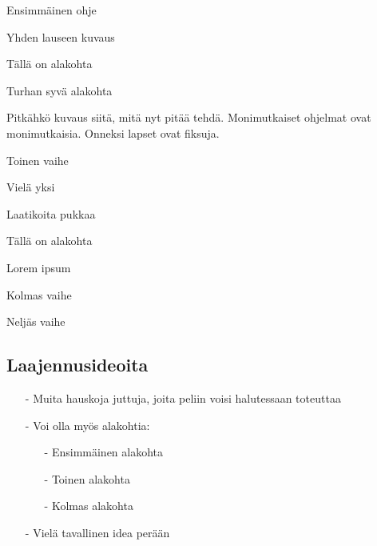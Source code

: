 \documentclass[12pt,twoside]{article}
\newenvironment{vaihetaso1}{%
    \LARGE
    \itemize
}{%
    \enditemize
}
\newenvironment{vaihetaso2}{%
    \Large
    \itemize
}{%
    \enditemize
}
\newenvironment{vaihetaso3}{%
    \large
    \itemize
}{%
    \enditemize
}
\begin{document}
\begin{vaihetaso1}
	\item Ensimmäinen ohje
	\begin{vaihetaso2}
		\item Yhden lauseen kuvaus
		\item Tällä on alakohta
		\begin{vaihetaso3}
			\item Turhan syvä alakohta
		\end{vaihetaso3}
		\item Pitkähkö kuvaus siitä, mitä nyt pitää tehdä. Monimutkaiset ohjelmat ovat monimutkaisia. Onneksi lapset ovat fiksuja.
	\end{vaihetaso2}
	\item Toinen vaihe
	\item Vielä yksi
	\begin{vaihetaso2}
		\item Laatikoita pukkaa
		\item Tällä on alakohta
		\item Lorem ipsum
	\end{vaihetaso2}
	\item Kolmas vaihe
	\item Neljäs vaihe
\end{vaihetaso1}

\subsection*{Laajennusideoita}
\begin{itemize}
	\item[-] Muita hauskoja juttuja, joita peliin voisi halutessaan toteuttaa
	\item[-] Voi olla myös alakohtia:
	\begin{itemize}
		\item[-] Ensimmäinen alakohta
		\item[-] Toinen alakohta
		\item[-] Kolmas alakohta
	\end{itemize} 
	\item[-] Vielä tavallinen idea perään
\end{itemize}
\end{document}
